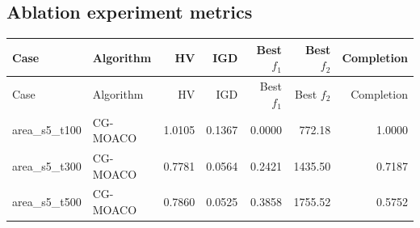 \subsection*{Ablation experiment metrics}
\begin{longtable}{llrrrrr}
\toprule
Case & Algorithm & HV & IGD & Best $f_1$ & Best $f_2$ & Completion \\
\midrule
\endfirsthead
\toprule
Case & Algorithm & HV & IGD & Best $f_1$ & Best $f_2$ & Completion \\
\midrule
\endhead
area\_s5\_t100 & CG-MOACO & 1.0105 & 0.1367 & 0.0000 & 772.18 & 1.0000 \\
area\_s5\_t300 & CG-MOACO & 0.7781 & 0.0564 & 0.2421 & 1435.50 & 0.7187 \\
area\_s5\_t500 & CG-MOACO & 0.7860 & 0.0525 & 0.3858 & 1755.52 & 0.5752 \\
\bottomrule
\end{longtable}
